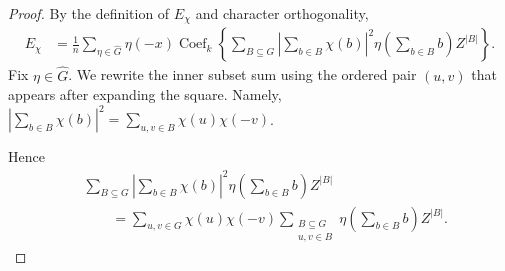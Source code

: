 \documentclass[10pt,a4paper]{amsart}
\begin{document}
\begin{proof}
	By the definition of \(E_\chi\) and character orthogonality,
	\[
	\begin{aligned}
	E_\chi
	&=
	\frac1n
	\sum_{\eta\in\widehat G}
	\eta(-x)
	\operatorname{Coef}_{k}\left\{
	\sum_{B\subseteq G}
	\left|\sum_{b\in B}\chi(b)\right|^2
	\eta\left(\sum_{b\in B}b\right)
	Z^{|B|}\right\}.
	\end{aligned}
	\]
Fix \(\eta\in\widehat G\). We rewrite the inner subset sum using the ordered pair \((u,v)\) that appears after expanding the square. Namely,
$\left|\sum_{b\in B}\chi(b)\right|^2=\sum_{u,v\in B}\chi(u)\chi(-v)$.

Hence
\begin{equation}\label{eq:pair-counting-view}
	\begin{aligned}
		&\sum_{B\subseteq G}
		\left|\sum_{b\in B}\chi(b)\right|^2
		\eta\left(\sum_{b\in B}b\right)Z^{|B|} \\
		&\qquad =
		\sum_{u,v\in G}\chi(u)\chi(-v)
		\sum_{\substack{B\subseteq G\\ u,v\in B}}
		\eta\left(\sum_{b\in B}b\right)Z^{|B|}.
	\end{aligned}
\end{equation}



\end{proof}
\end{document}
